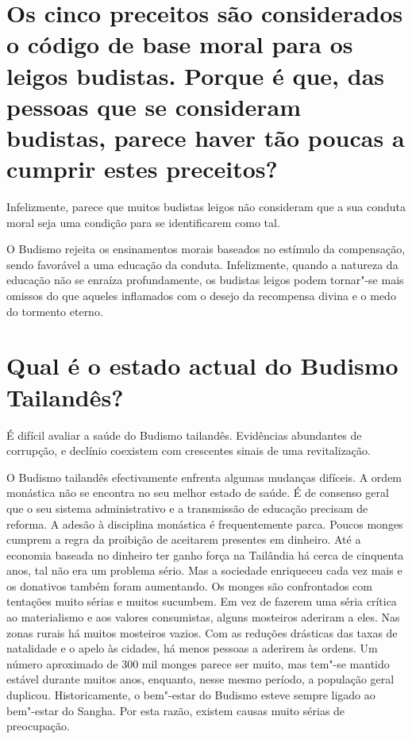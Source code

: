 \section{Os cinco preceitos são considerados o código de base moral para os
  leigos budistas. Porque é que, das pessoas que se consideram budistas, parece
  haver tão poucas a cumprir estes preceitos?}

Infelizmente, parece que muitos budistas leigos não consideram que a sua
conduta moral seja uma condição para se identificarem como tal.

O Budismo rejeita os ensinamentos morais baseados no estímulo da
compensação, sendo favorável a uma educação da conduta. Infelizmente,
quando a natureza da educação não se enraíza profundamente, os budistas
leigos podem tornar"-se mais omissos do que aqueles inflamados com o
desejo da recompensa divina e o medo do tormento eterno.

\section{Qual é o estado actual do Budismo Tailandês?}

É difícil avaliar a saúde do Budismo tailandês. Evidências abundantes de
corrupção, e declínio coexistem com crescentes sinais de uma
revitalização.

O Budismo tailandês efectivamente enfrenta algumas mudanças difíceis. A
ordem monástica não se encontra no seu melhor estado de saúde. É de
consenso geral que o seu sistema administrativo e a transmissão de
educação precisam de reforma. A adesão à disciplina monástica é
frequentemente parca. Poucos monges cumprem a regra da proibição de
aceitarem presentes em dinheiro. Até a economia baseada no dinheiro ter
ganho força na Tailândia há cerca de cinquenta anos, tal não era um
problema sério. Mas a sociedade enriqueceu cada vez mais e os donativos
também foram aumentando. Os monges são confrontados com tentações muito
sérias e muitos sucumbem. Em vez de fazerem uma séria crítica ao
materialismo e aos valores consumistas, alguns mosteiros aderiram a
eles. Nas zonas rurais há muitos mosteiros vazios. Com as reduções
drásticas das taxas de natalidade e o apelo às cidades, há menos pessoas
a aderirem às ordens. Um número aproximado de 300 mil monges parece ser
muito, mas tem"-se mantido estável durante muitos anos, enquanto, nesse
mesmo período, a população geral duplicou. Historicamente, o bem"-estar
do Budismo esteve sempre ligado ao bem"-estar do Sangha. Por esta razão,
existem causas muito sérias de preocupação.

